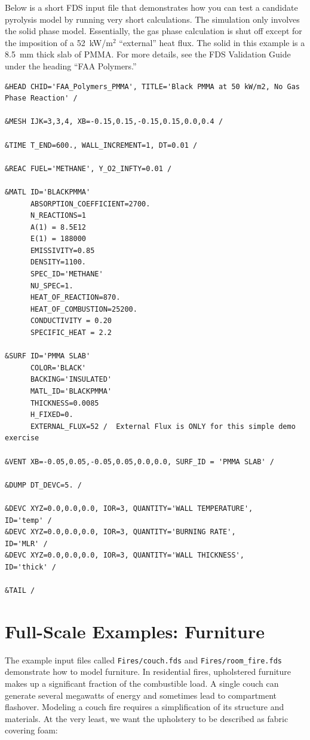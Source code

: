 \documentclass[11pt]{book}
\newcommand{\ct}{\tt\small}
\begin{document}
\noindent Below is a short FDS input file that demonstrates how you can test a candidate pyrolysis model by running very short calculations. The simulation only
involves the solid phase model. Essentially, the gas phase calculation is
shut off except for the imposition of a 52~kW/m$^2$ ``external'' heat flux. The solid in this example is a 8.5~mm thick slab of PMMA. For more
details, see the FDS Validation Guide under the heading ``FAA Polymers.''


\scriptsize
\begin{verbatim}
&HEAD CHID='FAA_Polymers_PMMA', TITLE='Black PMMA at 50 kW/m2, No Gas Phase Reaction' /

&MESH IJK=3,3,4, XB=-0.15,0.15,-0.15,0.15,0.0,0.4 /

&TIME T_END=600., WALL_INCREMENT=1, DT=0.01 /

&REAC FUEL='METHANE', Y_O2_INFTY=0.01 /

&MATL ID='BLACKPMMA'
      ABSORPTION_COEFFICIENT=2700.
      N_REACTIONS=1
      A(1) = 8.5E12
      E(1) = 188000
      EMISSIVITY=0.85
      DENSITY=1100.
      SPEC_ID='METHANE'
      NU_SPEC=1.
      HEAT_OF_REACTION=870.
      HEAT_OF_COMBUSTION=25200.
      CONDUCTIVITY = 0.20
      SPECIFIC_HEAT = 2.2

&SURF ID='PMMA SLAB'
      COLOR='BLACK'
      BACKING='INSULATED'
      MATL_ID='BLACKPMMA'
      THICKNESS=0.0085
      H_FIXED=0.
      EXTERNAL_FLUX=52 /  External Flux is ONLY for this simple demo exercise

&VENT XB=-0.05,0.05,-0.05,0.05,0.0,0.0, SURF_ID = 'PMMA SLAB' /

&DUMP DT_DEVC=5. /

&DEVC XYZ=0.0,0.0,0.0, IOR=3, QUANTITY='WALL TEMPERATURE',     ID='temp' /
&DEVC XYZ=0.0,0.0,0.0, IOR=3, QUANTITY='BURNING RATE',         ID='MLR' /
&DEVC XYZ=0.0,0.0,0.0, IOR=3, QUANTITY='WALL THICKNESS',       ID='thick' /

&TAIL /
\end{verbatim} \normalsize


\clearpage

\section{Full-Scale Examples: Furniture}

The example input files called {\ct Fires/couch.fds} and {\ct Fires/room\_fire.fds} demonstrate how to model furniture.
In residential fires, upholstered furniture makes up a significant
fraction of the combustible load. A single couch can generate several
megawatts of energy and sometimes lead to compartment flashover. Modeling
a couch fire requires a simplification of its structure and materials.
At the very least, we want the upholstery to be described as fabric covering foam:
\end{document}
